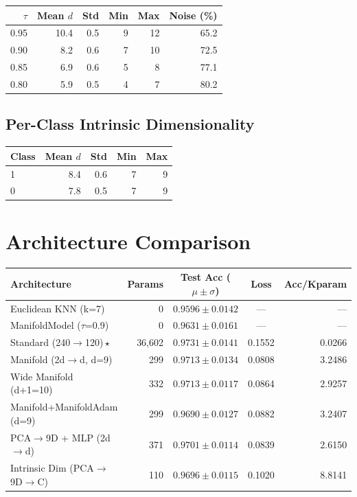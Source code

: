 \documentclass[11pt,letterpaper]{article}
\begin{document}
\begin{tabular}{@{}rrrrrr@{}}
\toprule
$\tau$ & Mean $d$ & Std & Min & Max & Noise (\%) \\
\midrule
  0.95 & 10.4 & 0.5 & 9 & 12 & 65.2 \\
  0.90 & 8.2 & 0.6 & 7 & 10 & 72.5 \\
  0.85 & 6.9 & 0.6 & 5 & 8 & 77.1 \\
  0.80 & 5.9 & 0.5 & 4 & 7 & 80.2 \\
\bottomrule
\end{tabular}

\subsection{Per-Class Intrinsic Dimensionality}

\begin{tabular}{@{}lrrrr@{}}
\toprule
Class & Mean $d$ & Std & Min & Max \\
\midrule
  1 & 8.4 & 0.6 & 7 & 9 \\
  0 & 7.8 & 0.5 & 7 & 9 \\
\bottomrule
\end{tabular}

\section{Architecture Comparison}

{\small
\begin{tabular}{@{}p{7cm}rccr@{}}
\toprule
\textbf{Architecture} & \textbf{Params} & \textbf{Test Acc ($\mu \pm \sigma$)} & \textbf{Loss} & \textbf{Acc/Kparam} \\
\midrule
  {Euclidean KNN (k=7)} & 0 & $0.9596 \pm 0.0142$ & --- & --- \\
  {ManifoldModel ($\tau$=0.9)} & 0 & $0.9631 \pm 0.0161$ & --- & --- \\
  {\color{wincolor}Standard (240$\rightarrow$120)\,$\star$} & 36,602 & $0.9731 \pm 0.0141$ & 0.1552 & 0.0266 \\
  {Manifold (2d$\rightarrow$d, d=9)} & 299 & $0.9713 \pm 0.0134$ & 0.0808 & 3.2486 \\
  {Wide Manifold (d+1=10)} & 332 & $0.9713 \pm 0.0117$ & 0.0864 & 2.9257 \\
  {Manifold+ManifoldAdam (d=9)} & 299 & $0.9690 \pm 0.0127$ & 0.0882 & 3.2407 \\
  {PCA$\rightarrow$9D + MLP (2d$\rightarrow$d)} & 371 & $0.9701 \pm 0.0114$ & 0.0839 & 2.6150 \\
  {Intrinsic Dim (PCA$\rightarrow$9D$\rightarrow$C)} & 110 & $0.9696 \pm 0.0115$ & 0.1020 & 8.8141 \\
\bottomrule
\end{tabular}
}
\end{document}
